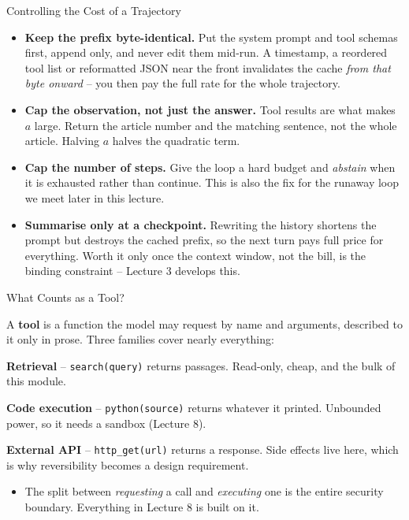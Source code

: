 \begin{frame}{Controlling the Cost of a Trajectory}
\small
\begin{itemize}
  \item \textbf{Keep the prefix byte-identical.} Put the system prompt and tool schemas first, append only, and never edit them mid-run. A timestamp, a reordered tool list or reformatted JSON near the front invalidates the cache \emph{from that byte onward} -- you then pay the full rate for the whole trajectory.
  \pause
  \item \textbf{Cap the observation, not just the answer.} Tool results are what makes $a$ large. Return the article number and the matching sentence, not the whole article. Halving $a$ halves the quadratic term.
  \pause
  \item \textbf{Cap the number of steps.} Give the loop a hard budget and \emph{abstain} when it is exhausted rather than continue. This is also the fix for the runaway loop we meet later in this lecture.
  \pause
  \item \textbf{Summarise only at a checkpoint.} Rewriting the history shortens the prompt but destroys the cached prefix, so the next turn pays full price for everything. Worth it only once the context window, not the bill, is the binding constraint -- Lecture 3 develops this.
\end{itemize}
\end{frame}

\begin{frame}{What Counts as a Tool?}
\begin{rldefinition}
A \textbf{tool} is a function the model may request by name and arguments, described to it only in prose. Three families cover nearly everything:

\smallskip
\textbf{Retrieval} -- \texttt{search(query)} returns passages. Read-only, cheap, and the bulk of this module.

\smallskip
\textbf{Code execution} -- \texttt{python(source)} returns whatever it printed. Unbounded power, so it needs a sandbox (Lecture 8).

\smallskip
\textbf{External API} -- \texttt{http\_get(url)} returns a response. Side effects live here, which is why reversibility becomes a design requirement.
\end{rldefinition}
\pause
\begin{itemize}
  \item The split between \emph{requesting} a call and \emph{executing} one is the entire security boundary. Everything in Lecture 8 is built on it.
\end{itemize}
\end{frame}

